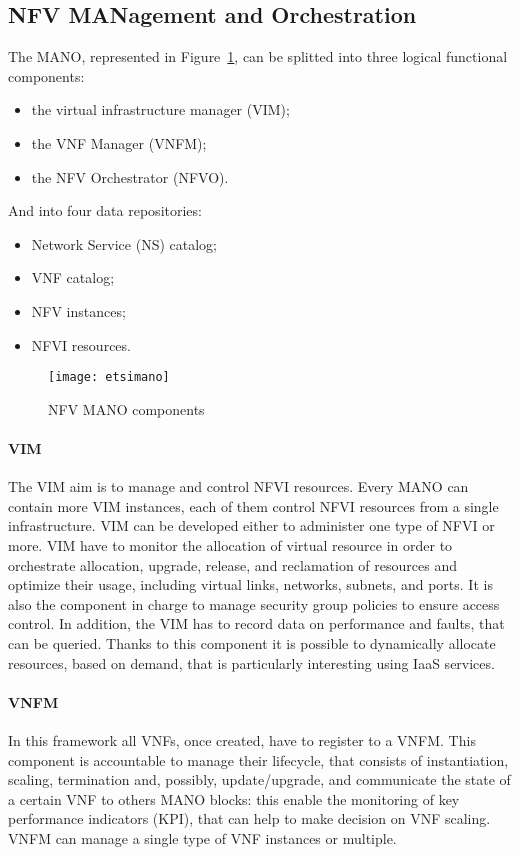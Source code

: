 \subsection{NFV MANagement and Orchestration}
The MANO, represented in Figure~\ref{chap:background:img:etsimano}, can be
splitted into three logical functional components:
\begin{itemize}
  \item the virtual infrastructure manager (VIM);
  \item the VNF Manager (VNFM);
  \item the NFV Orchestrator (NFVO).
\end{itemize}
And into four data repositories:
\begin{itemize}
  \item Network Service (NS) catalog;
  \item VNF catalog;
  \item NFV instances;
  \item NFVI resources.
\end{itemize}

\begin{figure}
  \centering
  \texttt{[image: etsimano]}
  \caption{NFV MANO components}
  \label{chap:background:img:etsimano}
\end{figure}


\paragraph*{VIM}
The VIM aim is to manage and control NFVI resources. Every MANO can contain more
VIM instances, each of them control NFVI resources from a single infrastructure.
VIM can be developed either to administer one type of NFVI or more. VIM have to
monitor the allocation of virtual resource in order to orchestrate allocation,
upgrade, release, and reclamation of resources and optimize their usage,
including virtual links, networks, subnets, and ports. It is also the component
in charge to manage security group policies to ensure access control. In
addition, the VIM has to record data on performance and faults, that can be
queried. Thanks to this component it is possible to dynamically allocate
resources, based on demand, that is particularly interesting using IaaS
services.

\paragraph*{VNFM} 
In this framework all VNFs, once created, have to register to a VNFM. This
component is accountable to manage their lifecycle, that consists of
instantiation, scaling, termination and, possibly, update/upgrade, and
communicate the state of a certain VNF to others MANO blocks: this enable the
monitoring of key performance indicators (KPI), that can help to make decision
on VNF scaling. VNFM can manage a single type of VNF instances or multiple.

